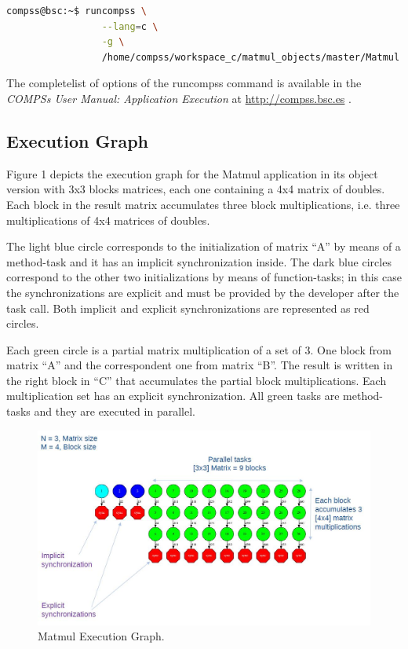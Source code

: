 \begin{lstlisting}[language=bash]
compss@bsc:~$ runcompss \
                 --lang=c \
                 -g \
                 /home/compss/workspace_c/matmul_objects/master/Matmul 3 4 2.0
\end{lstlisting}

The completelist of options of the runcompss command is available in the \textit{COMPSs User Manual: Application
Execution} at \url{http://compss.bsc.es} . 

\subsection{Execution Graph}
Figure 1 depicts the execution graph for the Matmul application in its object version with 3x3 blocks matrices, each one containing a 4x4 matrix of doubles.
Each block in the result matrix accumulates three block multiplications, i.e. three multiplications of 4x4 matrices of doubles.

The light blue circle corresponds to the initialization of matrix ``A'' by means of a method-task and it has 
an implicit synchronization inside. The dark blue circles correspond to the other two initializations by 
means of function-tasks; in this case the synchronizations are explicit and must be provided by the developer after the 
task call. Both implicit and explicit synchronizations are represented as red circles.

Each green circle is a partial matrix multiplication of a set of 3. One block from matrix ``A'' and the 
correspondent one from matrix ``B''. The result is written in the right block in ``C'' that accumulates 
the partial block multiplications. Each multiplication set has an explicit synchronization. 
All green tasks are method-tasks and they are executed in parallel.

\begin{figure}[ht!]
  \centering
    \includegraphics[width=1.0\textwidth]{./Sections/4_C/Figures/matmul.jpeg}
    \caption{Matmul Execution Graph.}
\end{figure}
